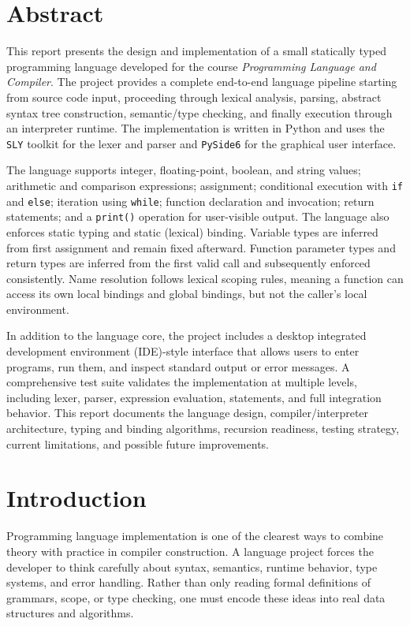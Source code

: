 \documentclass[12pt,a4paper]{article}
\begin{document}
\tableofcontents
\newpage

\section{Abstract}
This report presents the design and implementation of a small statically typed programming language developed for the course \textit{Programming Language and Compiler}. The project provides a complete end-to-end language pipeline starting from source code input, proceeding through lexical analysis, parsing, abstract syntax tree construction, semantic/type checking, and finally execution through an interpreter runtime. The implementation is written in Python and uses the \texttt{SLY} toolkit for the lexer and parser and \texttt{PySide6} for the graphical user interface.

The language supports integer, floating-point, boolean, and string values; arithmetic and comparison expressions; assignment; conditional execution with \texttt{if} and \texttt{else}; iteration using \texttt{while}; function declaration and invocation; return statements; and a \texttt{print()} operation for user-visible output. The language also enforces static typing and static (lexical) binding. Variable types are inferred from first assignment and remain fixed afterward. Function parameter types and return types are inferred from the first valid call and subsequently enforced consistently. Name resolution follows lexical scoping rules, meaning a function can access its own local bindings and global bindings, but not the caller's local environment.

In addition to the language core, the project includes a desktop integrated development environment (IDE)-style interface that allows users to enter programs, run them, and inspect standard output or error messages. A comprehensive test suite validates the implementation at multiple levels, including lexer, parser, expression evaluation, statements, and full integration behavior. This report documents the language design, compiler/interpreter architecture, typing and binding algorithms, recursion readiness, testing strategy, current limitations, and possible future improvements.

\section{Introduction}
Programming language implementation is one of the clearest ways to combine theory with practice in compiler construction. A language project forces the developer to think carefully about syntax, semantics, runtime behavior, type systems, and error handling. Rather than only reading formal definitions of grammars, scope, or type checking, one must encode these ideas into real data structures and algorithms.
\end{document}
